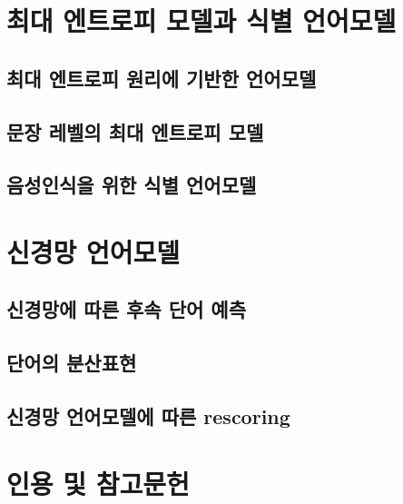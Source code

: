 \documentclass[../main.tex]{subfiles}
\begin{document}
\section{최대 엔트로피 모델과 식별 언어모델}
\subsection{최대 엔트로피 원리에 기반한 언어모델}
\subsection{문장 레벨의 최대 엔트로피 모델}
\subsection{음성인식을 위한 식별 언어모델}

\section{신경망 언어모델}
\subsection{신경망에 따른 후속 단어 예측}
\subsection{단어의 분산표현}
\subsection{신경망 언어모델에 따른 rescoring}

\section*{인용 및 참고문헌}
\end{document}
